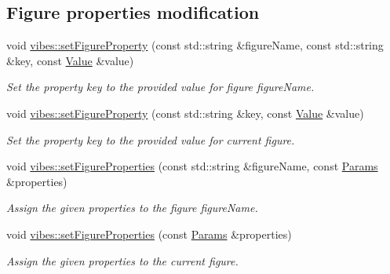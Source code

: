 \subsection*{Figure properties modification}
\begin{DoxyCompactItemize}
\item 
void \hyperlink{group__figure_ga9ca04dbb976e764ef5eb85d33f1dc9cb}{vibes\+::set\+Figure\+Property} (const std\+::string \&figure\+Name, const std\+::string \&key, const \hyperlink{classvibes_1_1_value}{Value} \&value)
\begin{DoxyCompactList}\small\item\em Set the property {\itshape key} to the provided {\itshape value} for figure {\itshape figure\+Name}. \end{DoxyCompactList}\item 
void \hyperlink{group__figure_gac7568a3fa42cfda574b570eed0c7edac}{vibes\+::set\+Figure\+Property} (const std\+::string \&key, const \hyperlink{classvibes_1_1_value}{Value} \&value)
\begin{DoxyCompactList}\small\item\em Set the property {\itshape key} to the provided {\itshape value} for current figure. \end{DoxyCompactList}\item 
\mbox{\label{group__figure_gabef77ec6edd8558cfe1b0895ed217e4c}} 
void \hyperlink{group__figure_gabef77ec6edd8558cfe1b0895ed217e4c}{vibes\+::set\+Figure\+Properties} (const std\+::string \&figure\+Name, const \hyperlink{classvibes_1_1_params}{Params} \&properties)
\begin{DoxyCompactList}\small\item\em Assign the given {\itshape properties} to the figure {\itshape figure\+Name}. \end{DoxyCompactList}\item 
\mbox{\label{group__figure_gaac344cd02f33c886c3da7bae58f1bcb8}} 
void \hyperlink{group__figure_gaac344cd02f33c886c3da7bae58f1bcb8}{vibes\+::set\+Figure\+Properties} (const \hyperlink{classvibes_1_1_params}{Params} \&properties)
\begin{DoxyCompactList}\small\item\em Assign the given {\itshape properties} to the current figure. \end{DoxyCompactList}\end{DoxyCompactItemize}


